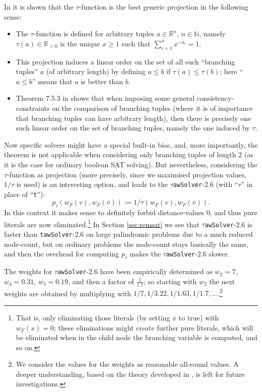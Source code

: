 \documentclass[final,3p,times]{elsarticle}
\theoremstyle{definition}
\newcommand{\ol}{\overline}
\newcommand{\NN}{\mathbb{N}}
\newcommand{\RR}{\mathbb{R}}
\newcommand{\tawsolver}{\texttt{tawSolver}}
\newcommand{\ntawsolver}{\tawsolver-2.6}
\newcommand{\ttawsolver}{$\tau$\texttt{awSolver}-2.6}
\begin{document}
In \cite{Kullmann2007HandbuchTau} it is shown that the $\tau$-function is the best generic projection in the following sense:
\begin{itemize}
\item The $\tau$-function is defined for arbitrary tuples $a \in \RR^n$, $n \in \NN$, namely $\tau(a) \in \RR_{>0}$ is the unique $x \ge 1$ such that $\sum_{i=1}^n x^{-a_i} = 1$.
\item This projection induces a linear order on the set of all such ``branching tuples'' $a$ (of arbitrary length) by defining $a \le b$ if $\tau(a) \le \tau(b)$; here ``$a \le b$'' means that $a$ is better than $b$.
\item Theorem 7.5.3 in \cite{Kullmann2007HandbuchTau} shows that when imposing some general consistency-constraints on the comparison of branching tuples (where it is of importance that branching tuples can have arbitrary length), then there is precisely one such linear order on the set of branching tuples, namely the one induced by $\tau$.
\end{itemize}
Now specific solvers might have a special built-in bias, and, more importantly, the theorem is not applicable when considering only branching tuples of length $2$ (as it is the case for ordinary boolean SAT solving). But nevertheless, considering the $\tau$-function as projection (more precisely, since we maximised projection values, $1/\tau$ is used) is an interesting option, and leads to the \ttawsolver{} (with ``$\tau$'' in place of ``\texttt{t}''):
\begin{displaymath}
  p_{\tau}(w_F(v), w_F(\ol{v})) := 1 / \tau(w_F(v), w_F(\ol{v})).
\end{displaymath}
In this context it makes sense to definitely forbid distance-values $0$, and thus pure literals are now eliminated.\footnote{That is, only eliminating those literals (by setting $\ol{x}$ to true) with $w_F(x) = 0$; these eliminations might create further pure literals, which will be eliminated when in the child node the branching variable is computed, and so on.} In Section \ref{sec:remsat} we see that \ttawsolver{} is faster than \ntawsolver{} on large palindromic problems due to a much reduced node-count, but on ordinary problems the node-count stays basically the same, and then the overhead for computing $p_{\tau}$ makes the \ttawsolver{} slower.

The weights for \ttawsolver{} have been empirically determined as $w_2 = 7$, $w_4 = 0.31$, $w_5 = 0.19$, and then a factor of $\frac{1}{1.7}$; so starting with $w_2$ the next weights are obtained by multiplying with $1/7, 1/3.22, 1/1.63, 1/1.7, \dots$.\footnote{We consider the values for the weights as reasonable all-round values. A deeper understanding, based on the theory developed in \cite{Kullmann2007HandbuchTau}, is left for future investigations.}
\end{document}
